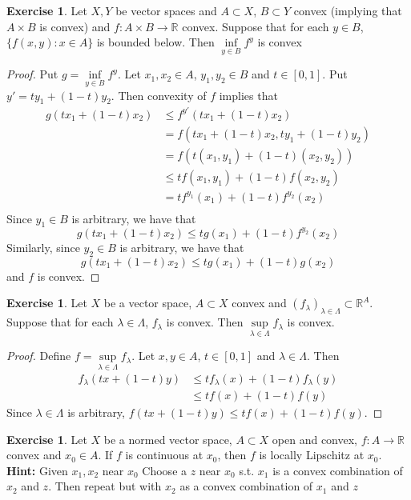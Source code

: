 \documentclass[12pt]{amsart}
\theoremstyle{definition}
\newtheorem{ex}[definition]{Exercise}
\newcommand{\lam}{\lambda}
\newcommand{\Lam}{\Lambda}
\newcommand{\R}{\mathbb{R}}
\newcommand{\lex}[1]{\label{ex:#1}}
\begin{document}
	\begin{ex} \lex{}
	Let $X, Y$ be vector spaces and $A \subset X$, $B \subset Y$ convex (implying that $A \times B$ is convex)  and $f:A \times B \rightarrow \R$ convex. Suppose that for each $y \in B$, $\{f(x, y): x \in A\}$ is bounded below. Then $\inf\limits_{y \in B}f^y$ is convex
	\end{ex}
	
	\begin{proof}
	Put $g = \inf\limits_{y \in B}f^y$. 
	Let $x_1, x_2 \in A$, $y_1, y_2 \in B$ and $t \in [0,1]$. Put $y'= ty_1 + (1-t)y_2$. Then convexity of $f$ implies that
	\begin{align*}
	g(tx_1 + (1-t)x_2) 
	& \leq f^{y'}(tx_1 + (1-t)x_2) \\
	&= f(tx_1 + (1-t)x_2, ty_1 + (1-t)y_2)\\
	&= f(t(x_1,y_1) + (1-t)(x_2, y_2)) \\
	& \leq tf(x_1, y_1) + (1-t)f(x_2, y_2) \\
	&= tf^{y_1}(x_1) + (1-t)f^{y_2}(x_2) \\
	\end{align*}
	Since $y_1 \in B$ is arbitrary, we have that $$g(tx_1 + (1-t)x_2) \leq tg(x_1) + (1-t)f^{y_2}(x_2)$$ Similarly, since $y_2 \in B$ is arbitrary, we have that $$g(tx_1 + (1-t)x_2) \leq tg(x_1) + (1-t)g(x_2)$$ and $f$ is convex.
	\end{proof}	

	\begin{ex} \lex{}
	Let $X$ be a vector space, $A \subset X$ convex and $ (f_{\lam})_{\lam \in \Lam} \subset \R^A$. Suppose that for each $\lam \in \Lam$, $f_\lam$ is convex. Then $\sup\limits_{\lam \in \Lam}f_\lam$ is convex.
	\end{ex}
	
	\begin{proof}
	Define $f = \sup\limits_{\lam \in \Lam} f_{\lam}$. Let $x, y \in A$, $t \in [0,1]$ and $\lam \in \Lam$. Then \begin{align*}
	f_\lam(tx + (1-t)y) 
	&\leq tf_\lam (x) + (1-t)f_\lam(y) \\
	& \leq tf(x) + (1-t)f(y) 
\end{align*}	
	Since $\lam \in \Lam$ is arbitrary, $f(tx + (1-t)y) \leq tf(x) + (1-t)f(y) $. 
	\end{proof}
	
	
	
	
	\begin{ex} \lex{}
	Let $X$ be a normed vector space, $A \subset X$ open and convex, $f:A \rightarrow \R$ convex and $x_0 \in A$. If $f$ is continuous at $x_0$, then $f$ is locally Lipschitz at $x_0$. \\
	\textbf{Hint:} Given $x_1, x_2$ near $x_0$ Choose a $z$ near $x_0$ s.t. $x_1$ is a convex combination of $x_2$ and $z$. Then repeat but with $x_2$ as a convex combination of $x_1$ and $z$
	\end{ex}
	
\end{document}
